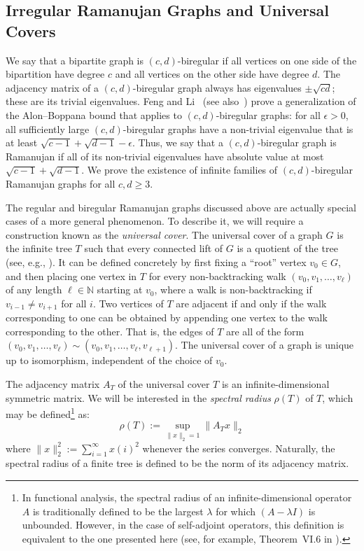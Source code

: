 \documentclass[11pt]{article}
\begin{document}
\subsection{Irregular Ramanujan Graphs and Universal Covers}\label{intro:irreg}
We say that a bipartite graph is $(c,d)$-biregular if all vertices on one
  side of the bipartition have degree $c$ and all vertices on the other side
  have degree $d$.
The adjacency matrix of a $(c,d)$-biregular graph always has eigenvalues
  $\pm \sqrt{cd}$; these are its trivial eigenvalues.
Feng and Li~\cite{FengLi} (see also~\cite{LiSole}) prove a generalization of the Alon--Boppana bound that applies
  to $(c,d)$-biregular graphs:
 for all $\epsilon > 0$, all sufficiently large $(c,d)$-biregular graphs
  have a non-trivial eigenvalue that is at least $\sqrt{c-1} + \sqrt{d-1} - \epsilon$.
Thus, we say that a $(c,d)$-biregular graph is Ramanujan if all of its non-trivial
  eigenvalues have absolute value at most
$
  \sqrt{c-1} + \sqrt{d-1}.
$
We prove the existence of infinite families of $(c,d)$-biregular Ramanujan graphs for all $c, d \geq 3$.

The regular and biregular Ramanujan graphs discussed above are actually
  special cases of a more general phenomenon.
To describe it, we will require a construction known as the {\em universal cover}.
The universal cover of a graph $G$ is the infinite tree $T$ such that every
  connected lift of $G$ is a quotient of the tree (see, e.g., \cite[Section
  6]{hoory2006expander}).
It can be defined concretely by first fixing a 
  ``root'' vertex $v_{0}\in G$, and then placing one vertex in $T$ for every
  non-backtracking walk $(v_0,v_1,\ldots,v_\ell)$ of any length $\ell\in\mathbb{N}$
  starting at $v_0$, where a walk is non-backtracking if $v_{i-1}\neq v_{i+1}$
  for all $i$.
Two vertices of $T$ are adjacent if and only if 
  the walk corresponding to one can be obtained by appending one vertex to
  the walk corresponding to the other.
That is, the edges of $T$ are all of the form $(v_0,v_1,\ldots, v_\ell)\sim(v_0,v_1,\ldots,v_\ell,v_{\ell+1})$.
The universal cover of a graph is unique up to isomorphism, independent of the
  choice of $v_0$.

The adjacency matrix $A_T$ of the universal cover $T$ is an infinite-dimensional
  symmetric matrix.
We will be interested in the {\em spectral radius} $\rho(T)$ of $T$, which may
  be defined\footnote{In functional analysis, the spectral radius of an
  infinite-dimensional operator $A$ is traditionally defined to be the largest $\lambda$ for which 
  $(A-\lambda I)$ is unbounded. However, in the case of self-adjoint operators,
  this definition is equivalent to the one presented here 
  (see, for example, Theorem~VI.6 in \cite{FuncAnal}).} as:
  \begin{equation}\label{specrad}
  \rho(T) := \sup_{\|x\|_2=1}{\|A_Tx\|_2}
  \end{equation}
where $\|x\|_2^2:=\sum_{i=1}^\infty x(i)^2$ whenever the series converges.
Naturally, the spectral radius of a finite tree is defined to be the norm of its adjacency
  matrix.
\end{document}
